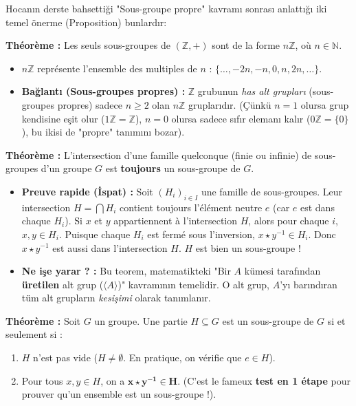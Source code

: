 \documentclass[12pt,a4paper]{report}
\begin{document}
Hocanın derste bahsettiği "Sous-groupe propre" kavramı sonrası anlattığı iki temel önerme (Proposition) bunlardır:

\begin{tcolorbox}[colback=blue!5!white,colframe=blue!75!black,title=Proposition 1 : Les Sous-groupes de $\mathbb{Z}$]
\textbf{Théorème :} Les seuls sous-groupes de $(\mathbb{Z}, +)$ sont de la forme $n\mathbb{Z}$, où $n \in \mathbb{N}$.
\begin{itemize}
    \item $n\mathbb{Z}$ représente l'ensemble des multiples de $n$ : $\{ \dots, -2n, -n, 0, n, 2n, \dots \}$.
    \item \textbf{Bağlantı (Sous-groupes propres) :} $\mathbb{Z}$ grubunun \textit{has alt grupları} (sous-groupes propres) sadece $n \geq 2$ olan $n\mathbb{Z}$ gruplarıdır. 
    (Çünkü $n=1$ olursa grup kendisine eşit olur ($1\mathbb{Z} = \mathbb{Z}$), $n=0$ olursa sadece sıfır elemanı kalır ($0\mathbb{Z} = \{0\}$), bu ikisi de "propre" tanımını bozar).
\end{itemize}
\end{tcolorbox}

\begin{tcolorbox}[colback=red!5!white,colframe=red!75!black,title=Proposition 2 : Intersection d'une Famille de Sous-groupes]
\textbf{Théorème :} L'intersection d'une famille quelconque (finie ou infinie) de sous-groupes d'un groupe $G$ est \textbf{toujours} un sous-groupe de $G$.
\begin{itemize}
    \item \textbf{Preuve rapide (İspat) :} Soit $(H_i)_{i \in I}$ une famille de sous-groupes. Leur intersection $H = \bigcap H_i$ contient toujours l'élément neutre $e$ (car $e$ est dans chaque $H_i$). Si $x$ et $y$ appartiennent à l'intersection $H$, alors pour chaque $i$, $x, y \in H_i$. Puisque chaque $H_i$ est fermé sous l'inversion, $x \star y^{-1} \in H_i$. Donc $x \star y^{-1}$ est aussi dans l'intersection $H$. $H$ est bien un sous-groupe !
    \item \textbf{Ne işe yarar ? :} Bu teorem, matematikteki "Bir $A$ kümesi tarafından \textbf{üretilen} alt grup ($\langle A \rangle$)" kavramının temelidir. O alt grup, $A$'yı barındıran tüm alt grupların \textit{kesişimi} olarak tanımlanır.
\end{itemize}
\end{tcolorbox}

\begin{tcolorbox}[colback=green!5!white,colframe=green!60!black,title=Proposition 3 : Caractérisation d'un Sous-groupe (Sous-groupe Testi)]
\textbf{Théorème :} Soit $G$ un groupe. Une partie $H \subseteq G$ est un sous-groupe de $G$ si et seulement si :
\begin{enumerate}
    \item $H$ n'est pas vide ($H \neq \emptyset$. En pratique, on vérifie que $e \in H$).
    \item Pour tous $x, y \in H$, on a $\mathbf{x \star y^{-1} \in H}$. (C'est le fameux \textbf{test en 1 étape} pour prouver qu'un ensemble est un sous-groupe !).
\end{enumerate}
\end{tcolorbox}
\end{document}
